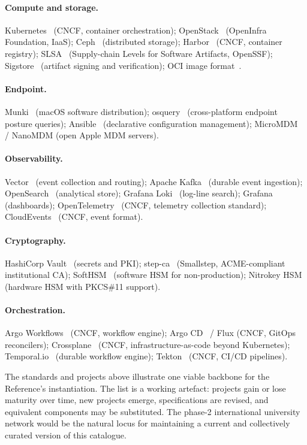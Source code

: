 \paragraph{Compute and storage.} Kubernetes~\cite{kubernetes} (CNCF,
container orchestration); OpenStack~\cite{openstack} (OpenInfra
Foundation, IaaS); Ceph~\cite{ceph} (distributed storage);
Harbor~\cite{harbor} (CNCF, container registry);
SLSA~\cite{slsa-spec} (Supply-chain Levels for Software Artifacts,
OpenSSF); Sigstore~\cite{sigstore} (artifact signing and
verification); OCI image format~\cite{oci-image-spec}.

\paragraph{Endpoint.} Munki~\cite{munki} (macOS software
distribution); osquery~\cite{osquery} (cross-platform endpoint
posture queries); Ansible~\cite{ansible} (declarative configuration
management); MicroMDM~\cite{micromdm} / NanoMDM (open Apple MDM
servers).

\paragraph{Observability.} Vector~\cite{vector-project} (event
collection and routing); Apache Kafka~\cite{kafka} (durable event
ingestion); OpenSearch~\cite{opensearch} (analytical store); Grafana
Loki~\cite{grafana-loki} (log-line search);
Grafana~\cite{grafana} (dashboards);
OpenTelemetry~\cite{opentelemetry-spec} (CNCF, telemetry collection
standard); CloudEvents~\cite{cloudevents-spec} (CNCF, event format).

\paragraph{Cryptography.} HashiCorp Vault~\cite{vault} (secrets and
PKI); step-ca~\cite{step-ca} (Smallstep, ACME-compliant institutional
CA); SoftHSM~\cite{softhsm} (software HSM for non-production);
Nitrokey HSM (hardware HSM with PKCS\#11 support).

\paragraph{Orchestration.} Argo Workflows~\cite{argo-workflows} (CNCF,
workflow engine); Argo CD~\cite{argocd} / Flux (CNCF, GitOps
reconcilers); Crossplane~\cite{crossplane} (CNCF,
infrastructure-as-code beyond Kubernetes);
Temporal.io~\cite{temporal} (durable workflow engine);
Tekton~\cite{tekton} (CNCF, CI/CD pipelines).

\medskip

\noindent The standards and projects above illustrate one viable
backbone for the Reference's instantiation. The list is a working
artefact: projects gain or lose maturity over time, new projects
emerge, specifications are revised, and equivalent components may
be substituted. The phase-2 international university network would
be the natural locus for maintaining a current and collectively
curated version of this catalogue.
